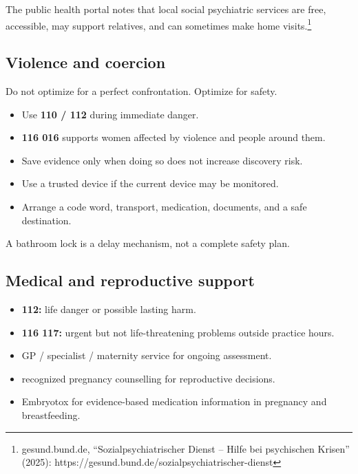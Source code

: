 The public health portal notes that local social psychiatric services
are free, accessible, may support relatives, and can sometimes make home
visits.\footnote{gesund.bund.de, ``Sozialpsychiatrischer Dienst -- Hilfe
  bei psychischen Krisen'' (2025):
  https://gesund.bund.de/sozialpsychiatrischer-dienst}

\hypertarget{violence-and-coercion}{%
\subsection{Violence and coercion}\label{violence-and-coercion}}

Do not optimize for a perfect confrontation. Optimize for safety.

\begin{itemize}
\tightlist
\item
  Use \textbf{110 / 112} during immediate danger.
\item
  \textbf{116 016} supports women affected by violence and people around
  them.
\item
  Save evidence only when doing so does not increase discovery risk.
\item
  Use a trusted device if the current device may be monitored.
\item
  Arrange a code word, transport, medication, documents, and a safe
  destination.
\end{itemize}

A bathroom lock is a delay mechanism, not a complete safety plan.

\hypertarget{medical-and-reproductive-support}{%
\subsection{Medical and reproductive
support}\label{medical-and-reproductive-support}}

\begin{itemize}
\tightlist
\item
  \textbf{112:} life danger or possible lasting harm.
\item
  \textbf{116 117:} urgent but not life-threatening problems outside
  practice hours.
\item
  GP / specialist / maternity service for ongoing assessment.
\item
  recognized pregnancy counselling for reproductive decisions.
\item
  Embryotox for evidence-based medication information in pregnancy and
  breastfeeding.
\end{itemize}

